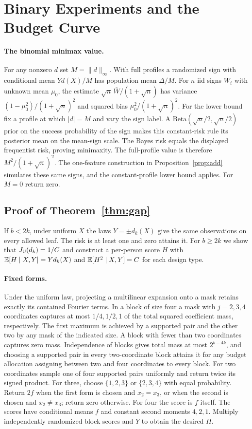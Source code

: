 \section{Binary Experiments and the Budget Curve}\label{app:sign}
\paragraph{The binomial minimax value.}
For any nonzero $d$ set $M=\|d\|_\infty$. With full profiles a randomized sign with conditional mean $Yd(X)/M$ has population mean $\Delta/M$. For $n$ iid signs $W_i$ with unknown mean $\mu_0$, the estimate $\sqrt n\,\overline W/(1+\sqrt n)$ has variance $(1-\mu_0^2)/(1+\sqrt n)^2$ and squared bias $\mu_0^2/(1+\sqrt n)^2$. For the lower bound fix a profile at which $|d|=M$ and vary the sign label. A $\mathrm{Beta}(\sqrt n/2,\sqrt n/2)$ prior on the success probability of the sign makes this constant-risk rule its posterior mean on the mean-sign scale. The Bayes risk equals the displayed frequentist risk, proving minimaxity. The full-profile value is therefore $M^2/(1+\sqrt n)^2$. The one-feature construction in Proposition~\ref{prop:add} simulates these same signs, and the constant-profile lower bound applies. For $M=0$ return zero.

\subsection{Proof of Theorem~\ref{thm:gap}}\label{app:gap}
If $b<2k$, under uniform $X$ the laws $Y=\pm d_k(X)$ give the same observations on every allowed leaf. The risk is at least one and zero attains it. For $b\ge2k$ we show that $J_\mathsf U(d_k)=1/C$ and construct a per-person score $H$ with $\mathbb{E}[H\mid X,Y]=Yd_k(X)$ and $\mathbb{E}[H^2\mid X,Y]=C$ for each design type.

\paragraph{Fixed forms.}
Under the uniform law, projecting a multilinear expansion onto a mask retains exactly its contained Fourier terms. In a block of size four a mask with $j=2,3,4$ coordinates captures at most $1/4,1/2,1$ of the total squared coefficient mass, respectively. The first maximum is achieved by a supported pair and the other two by any mask of the indicated size. A block with fewer than two coordinates captures zero mass. Independence of blocks gives total mass at most $2^{b-4k}$, and choosing a supported pair in every two-coordinate block attains it for any budget allocation assigning between two and four coordinates to every block. For two coordinates sample one of four supported pairs uniformly and return twice its signed product. For three, choose $\{1,2,3\}$ or $\{2,3,4\}$ with equal probability. Return $2f$ when the first form is chosen and $x_2=x_3$, or when the second is chosen and $x_2\ne x_3$; return zero otherwise. For four the score is $f$ itself. The scores have conditional means $f$ and constant second moments $4,2,1$. Multiply independently randomized block scores and $Y$ to obtain the desired $H$.


